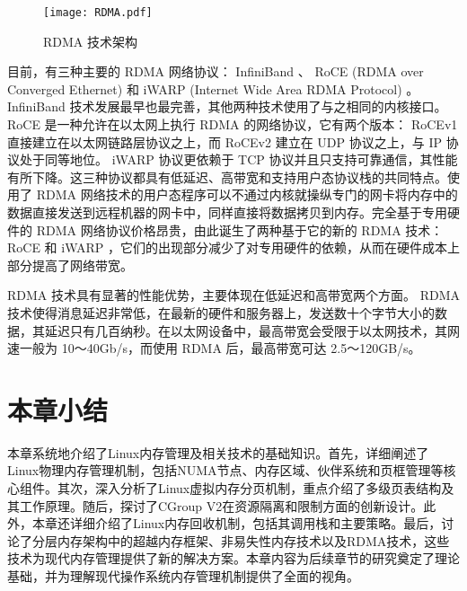 \begin{figure}[htb]
    \centering
    \texttt{[image: RDMA.pdf]}
    \caption{RDMA 技术架构}
    \label{fig:RDMA}
\end{figure}

目前，有三种主要的 RDMA 网络协议： InfiniBand 、 RoCE (RDMA over Converged Ethernet) 和 iWARP (Internet Wide Area RDMA Protocol) 。 InfiniBand 技术发展最早也最完善，其他两种技术使用了与之相同的内核接口。 RoCE 是一种允许在以太网上执行 RDMA 的网络协议，它有两个版本： RoCEv1 直接建立在以太网链路层协议之上，而 RoCEv2 建立在 UDP 协议之上，与 IP 协议处于同等地位。 iWARP 协议更依赖于 TCP 协议并且只支持可靠通信，其性能有所下降。这三种协议都具有低延迟、高带宽和支持用户态协议栈的共同特点。使用了 RDMA 网络技术的用户态程序可以不通过内核就操纵专门的网卡将内存中的数据直接发送到远程机器的网卡中，同样直接将数据拷贝到内存。完全基于专用硬件的 RDMA 网络协议价格昂贵，由此诞生了两种基于它的新的 RDMA 技术： RoCE 和 iWARP ，它们的出现部分减少了对专用硬件的依赖，从而在硬件成本上部分提高了网络带宽。

 RDMA 技术具有显著的性能优势，主要体现在低延迟和高带宽两个方面。 RDMA 技术使得消息延迟非常低，在最新的硬件和服务器上，发送数十个字节大小的数据，其延迟只有几百纳秒。在以太网设备中，最高带宽会受限于以太网技术，其网速一般为 10～40Gb/s，而使用 RDMA 后，最高带宽可达 2.5～120GB/s。

\section{本章小结}

本章系统地介绍了Linux内存管理及相关技术的基础知识。首先，详细阐述了Linux物理内存管理机制，包括NUMA节点、内存区域、伙伴系统和页框管理等核心组件。其次，深入分析了Linux虚拟内存分页机制，重点介绍了多级页表结构及其工作原理。随后，探讨了CGroup V2在资源隔离和限制方面的创新设计。此外，本章还详细介绍了Linux内存回收机制，包括其调用栈和主要策略。最后，讨论了分层内存架构中的超越内存框架、非易失性内存技术以及RDMA技术，这些技术为现代内存管理提供了新的解决方案。本章内容为后续章节的研究奠定了理论基础，并为理解现代操作系统内存管理机制提供了全面的视角。